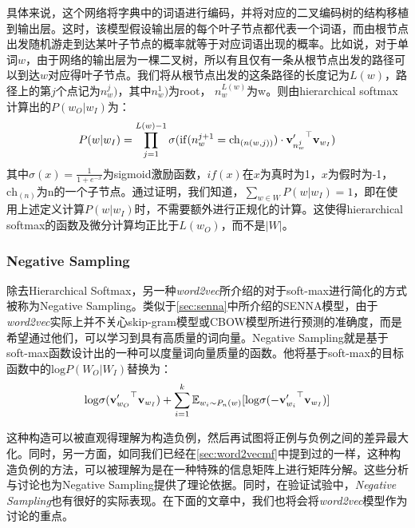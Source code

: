具体来说，这个网络将字典中的词语进行编码，并将对应的二叉编码树的结构移植到输出层。这时，该模型假设输出层的每个叶子节点都代表一个词语，而由根节点出发随机游走到达某叶子节点的概率就等于对应词语出现的概率。比如说，对于单词$w$，由于网络的输出层为一棵二叉树，所以有且仅有一条从根节点出发的路径可以到达$w$对应得叶子节点。我们将从根节点出发的这条路径的长度记为$L(w)$，路径上的第$j$个点记为$n_w^j)$，其中$n_w^1)$为root， $n_w^{L(w)}$为w。则由hierarchical softmax计算出的$P(w_O | w_I)$为：
\begin{equation}
\label{eq:HS}
P(w | w_I) = \prod_{j = 1}^{L(w) - 1} \sigma(\mathrm{if}(n_w^{j+1} = \mathrm{ch}_{(n(w,j))})\cdot {{{\mathbf v}}'_{n_w^j}}^\top {{\mathbf v}}_{w_I})
\end{equation}
其中$\sigma(x) = \frac{1}{1+e^{-x}}$为sigmoid激励函数，$if(x)$在$x$为真时为1，$x$为假时为-1，$\mathrm{ch}_(n)$为n的一个子节点。通过证明，我们知道，$\sum_{w \in W} P(w | w_I) = 1$，即在使用上述定义计算$P(w | w_I)$时，不需要额外进行正规化的计算。这使得hierarchical softmax的函数及微分计算均正比于$L(w_O)$，而不是$|W|$。

\subsubsection{Negative Sampling}

除去Hierarchical Softmax，另一种\emph{word2vec}所介绍的对于soft-max进行简化的方式被称为Negative Sampling。类似于\ref{sec:senna}中所介绍的SENNA模型，由于\emph{word2vec}实际上并不关心skip-gram模型或CBOW模型所进行预测的准确度，而是希望通过他们，可以学习到具有高质量的词向量。Negative Sampling就是基于soft-max函数设计出的一种可以度量词向量质量的函数。他将基于soft-max的目标函数中的$\mathrm{log}P(W_{O}|W_{I})$替换为：
\begin{equation}
\label{eq:NS}
\mathrm{log}\sigma({{{\mathbf v}}'_{w_O}}^\top{{\mathbf v}}_{w_I}) + \sum_{i = 1}^k \mathbb{E}_{w_i \sim P_n(w)}[\mathrm{log}\sigma(-{{{\mathbf v}}'_{w_i}}^\top{{\mathbf v}}_{w_I})]
\end{equation}

这种构造可以被直观得理解为构造负例，然后再试图将正例与负例之间的差异最大化。同时，另一方面，如同我们已经在\ref{sec:word2vecmf}中提到过的一样，这种构造负例的方法，可以被理解为是在一种特殊的信息矩阵上进行矩阵分解。这些分析与讨论也为Negative Sampling提供了理论依据。同时，在验证试验中，\emph{Negative Sampling}也有很好的实际表现。在下面的文章中，我们也将会将\emph{word2vec}模型作为讨论的重点。